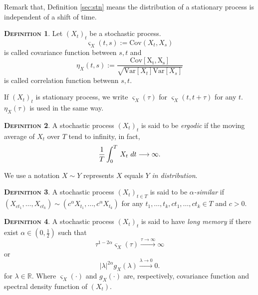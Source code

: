 \documentclass[a4paper, twoside, 11pt]{article}
\theoremstyle{definition}
\newtheorem{definition}{\scshape Definition}[section]
\begin{document}
Remark that, Definition \ref{sec:stn} means the distribution of a stationary process is independent of a shift of time.

\begin{definition}
  Let $(X_t)_t$ be a stochastic process. 
  \begin{equation*}
	\varsigma_X(t,s) := \mathrm{Cov}(X_t, X_s) 
  \end{equation*} is called covariance function between $s, t$ and 
  \begin{equation*}
	\eta_X(t, s) := \frac{\mathrm{Cov[X_t, X_s]}}{\sqrt{\mathrm{Var}[X_t]\mathrm{Var}[X_s]}}
  \end{equation*}
  is called correlation function betwenn $s, t$.
\end{definition}
If $(X_t)_t$ is stationary process, we write $\varsigma_X(\tau)$ for $\varsigma_X(t, t+\tau)$ for any $t$. $\eta_X(\tau)$ is used in the same way.

\begin{definition}
  A stochastic process $(X_t)_t$ is said to be \emph{ergodic} if the moving average of $X_t$ over $T$ tend to infinity, in fact,
  \begin{equation}
	\frac{1}{T}\int_0^T\,X_t\,\mathop{dt} \longrightarrow \infty\nonumber\\.
  \end{equation}
	\label{sec:erg}
\end{definition}

We use a notation $X \sim Y$ represents $X$ equals $Y$ \emph{in distribution}. 
\begin{definition}
  A stochastic process $(X_t)_{t\in T}$ is said to be \emph{$\alpha$-similar} if $(X_{ct_1},\dots,X_{ct_k}) \sim (c^\alpha X_{t_1},\dots, c^\alpha X_{t_k})$ for any $t_1,\dots, t_k, ct_1, \dots, ct_k \in T$ and $c>0$.
\end{definition}

\begin{definition}
  A stochastic process $(X_t)_t$ is said to have \emph{long memory} if there exist  $\alpha \in (0, \frac{1}{2})$ such that
  \begin{equation}
	\tau ^{1 - 2\alpha} \varsigma_X(\tau) \overset{\tau\rightarrow \infty}{\longrightarrow} \infty
	\label{sec:lm1}
  \end{equation}
   or 
  \begin{equation}
	|\lambda|^{2\alpha}g_X(\lambda) \overset{\lambda\rightarrow 0}{\longrightarrow} 0 .
	\label{sec:lm2}
  \end{equation}
  for $\lambda \in \mathbb{R}$. Where $\varsigma_X(\cdot)$ and $g_X(\cdot)$ are, respectively, covariance function and spectral density function of $(X_t)$.
\end{definition}
\end{document}
